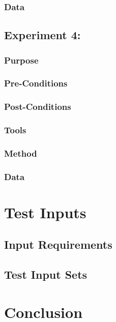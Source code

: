 \documentclass[letterpaper,10pt]{article}
\begin{document}
\subsubsection{Data}

\subsection{Experiment 4: }
\subsubsection{Purpose}
\subsubsection{Pre-Conditions}
\subsubsection{Post-Conditions}
\subsubsection{Tools}
\subsubsection{Method}
\subsubsection{Data}

\section{Test Inputs}
\subsection{Input Requirements}
\subsection{Test Input Sets}

\section{Conclusion}
\end{document}
